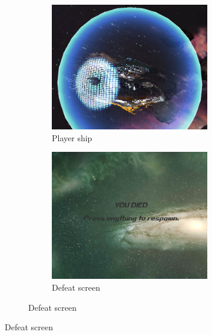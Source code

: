 \begin{figure}
\begin{subfigure}{0.49\textwidth}
\label{fig:left}
\end{subfigure}
\begin{subfigure}{0.49\textwidth}
\centering

\begin{subfigure}{0.49\textwidth}
\centering
\includegraphics[width = \textwidth, height=\textwidth]{images/game3}
\caption{Player ship}
\label{fig:top}
\end{subfigure}
\begin{subfigure}{0.49\textwidth}
\centering
\includegraphics[width = \textwidth, height=\textwidth]{images/game4}
\caption{Defeat screen}
\label{fig:bottom}
\end{subfigure}


\end{subfigure}
\end{figure}

